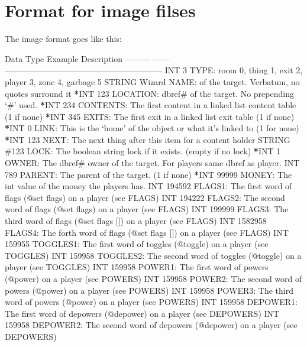 \documentclass[letterpaper,10pt,english]{sphinxmanual}
\begin{document}
\chapter{Format for image filses}
\label{\detokenize{38-imageformat:format-for-image-filses}}\label{\detokenize{38-imageformat::doc}}
\sphinxAtStartPar
The image format goes like this:

\sphinxAtStartPar
Data Type  Example  Description
———  ——\sphinxhyphen{}  ———————————————————\sphinxhyphen{}
INT        3        TYPE: room 0, thing 1, exit 2, player 3, zone 4, garbage 5
STRING     Wizard   NAME: of the target.  Verbatum, no quotes surround it
{\color{red}\bfseries{}*}INT       123      LOCATION: dbref\# of the target.  No prepending ‘\#’ used.
{\color{red}\bfseries{}*}INT       234      CONTENTS: The first content in a linked list content table (\sphinxhyphen{}1 if none)
{\color{red}\bfseries{}*}INT       345      EXITS: The first exit in a linked list exit table (\sphinxhyphen{}1 if none)
{\color{red}\bfseries{}*}INT       0        LINK: This is the ‘home’ of the object or what it’s linked to (\sphinxhyphen{}1 for none)
{\color{red}\bfseries{}*}INT       123      NEXT: The next thing after this item for a content holder
STRING     \#123     LOCK: The boolean string lock if it exists.  (empty if no lock)
{\color{red}\bfseries{}*}INT       1        OWNER: The dbref\# owner of the target.  For players same dbref as player.
INT        789      PARENT: The parent of the target.  (\sphinxhyphen{}1 if none)
{\color{red}\bfseries{}*}INT       99999    MONEY: The int value of the money the players has.
INT        194592   FLAGS1: The first word of flags (@set flags) on a player      (see FLAGS)
INT        194222   FLAGS2: The second word of flags (@set flags) on a player     (see FLAGS)
INT        199999   FLAGS3: The third word of flags (@set flags {[}{]}) on a player   (see FLAGS)
INT        1582958  FLAGS4: The forth word of flags (@set flags {[}{]}) on a player   (see FLAGS)
INT        159955   TOGGLES1: The first word of toggles (@toggle) on a player    (see TOGGLES)
INT        159958   TOGGLES2: The second word of toggles (@toggle) on a player   (see TOGGLES)
INT        159958   POWER1: The first word of powers (@power) on a player         (see POWERS)
INT        159958   POWER2: The second word of powers (@power) on a player        (see POWERS)
INT        159958   POWER3: The third word of powers (@power) on a player         (see POWERS)
INT        159958   DEPOWER1: The first word of depowers (@depower) on a player  (see DEPOWERS)
INT        159958   DEPOWER2: The second word of depowers (@depower) on a player (see DEPOWERS)
\end{document}
